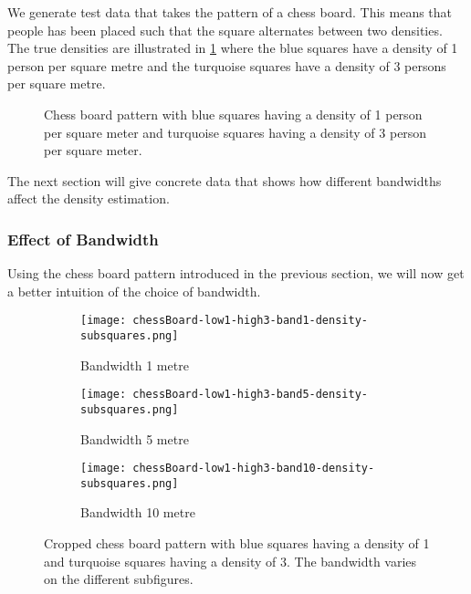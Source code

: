 We generate test data that takes the pattern of a chess board. This means that people has been placed such that the square alternates between two densities. The true densities are illustrated in \cref{fig:chessBoard-low1-high3-band5} where the blue squares have a density of 1 person per square metre and the turquoise squares have a density of 3 persons per square metre.


\begin{figure}[htbp]
\centering
{}
    \caption{Chess board pattern with blue squares having a density of 1 person per square meter and turquoise squares having a density of 3 person per square meter.}
    \label{fig:chessBoard-low1-high3-band5}
\end{figure}

The next section will give concrete data that shows how different bandwidths affect the density estimation.

\subsubsection{Effect of Bandwidth}

Using the chess board pattern introduced in the previous section, we will now get a better intuition of the choice of bandwidth. 

\begin{figure}[htbp]
\centering

\begin{subfigure}[c]{.32\linewidth}
    \centering
    \texttt{[image: chessBoard-low1-high3-band1-density-subsquares.png]}
    \caption{Bandwidth 1 metre}
    \label{fig:chessBoard-low1-high3-band1-cropped}
\end{subfigure}
%
\begin{subfigure}[c]{.32\linewidth}
    \centering
    \texttt{[image: chessBoard-low1-high3-band5-density-subsquares.png]}
    \caption{Bandwidth 5 metre}
    \label{fig:chessBoard-low1-high3-band5-cropped}
\end{subfigure}
%
\begin{subfigure}[c]{.32\linewidth}
    \centering
    \texttt{[image: chessBoard-low1-high3-band10-density-subsquares.png]}
    \caption{Bandwidth 10 metre}
    \label{fig:chessBoard-low1-high3-band10-cropped}
\end{subfigure}
%
\caption{Cropped chess board pattern with blue squares having a density of 1 and turquoise squares having a density of 3. The bandwidth varies on the different subfigures.}
\label{fig:chessBoard-different-bandwidths}
\end{figure}


